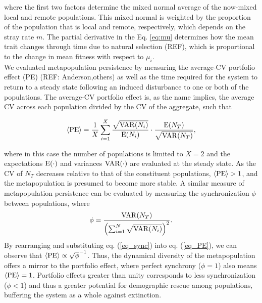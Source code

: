 \documentclass[twocolumn,preprintnumbers,amsmath,amssymb,superscriptaddress]{revtex4}
\begin{document}
\noindent where the first two factors determine the mixed normal average of the now-mixed local and remote populations.
This mixed normal is weighted by the proportion of the population that is local and remote, respectively, which depends on the stray rate $m$.
The partial derivative in the Eq. \ref{eq:mu} determines how the mean trait changes through time due to natural selection (REF), which is proportional to the change in mean fitness with respect to $\mu_i$.
\\

\noindent We evaluated metapopulation persistence by measuring the average-CV portfolio effect (PE) (REF: Anderson,others) as well as the time required for the system to return to a steady state following an induced disturbance to one or both of the populations.
The average-CV portfolio effect is, as the name implies, the average CV across each population divided by the CV of the aggregate, such that


\begin{equation}
\langle{\rm PE}\rangle =\frac{1}{X}\sum_{i=1}^{X} \frac{\sqrt{{\rm VAR}(N_i)}}{{\rm E}(N_i)}\cdot \frac{{\rm E}(N_T)}{\sqrt{{\rm VAR}(N_T)}},
\label{eq:pe}
\end{equation}

\noindent where in this case the number of populations is limited to $X=2$ and the expectations $\rm E(\cdot)$ and variances $\rm VAR(\cdot)$ are evaluated at the steady state.
As the CV of $N_T$ decreases relative to that of the constituent populations, $\langle{\rm PE}\rangle > 1$, and the metapopulation is presumed to become more stable.
A similar measure of metapopulation persistence can be evaluated by measuring the synchronization $\phi$ between populations, where 
\begin{equation}
\label{eq_sync}
\phi = \frac{{\rm VAR}(N_T)}{\left(\sum_{i=1}^N\sqrt{{\rm VAR}(N_i)}\right)^2}.
\end{equation}
By rearranging and substituting eq. (\ref{eq_sync}) into eq. (\ref{eq_PE}), we can observe that $\langle{\rm PE}\rangle \propto \sqrt{\phi}^{-1}$.
Thus, the dynamical diversity of the metapopulation offers a mirror to the portfolio effect, where perfect synchrony ($\phi = 1$) also means $\langle{\rm PE}\rangle = 1$.
Portfolio effects greater than unity corresponds to less synchronization ($\phi < 1$) \cite{Loreau:2008ju,Anderson:2014cx,Yeakel:2013vz} and thus a greater potential for demographic rescue among populations, buffering the system as a whole against extinction. 
\end{document}
